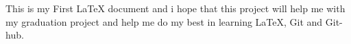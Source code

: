 \documentclass[12pt]{article}
\begin{document}
This is my First LaTeX document and i hope that this project will help me with my graduation project and help me do my best in learning LaTeX, Git and Git-hub.
\end{document}
